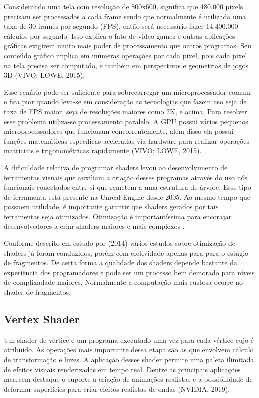 Considerando uma tela com resolução de 800x600, significa que 480.000 pixels precisam ser processados a cada frame sendo que normalmente é utilizada uma taxa de 30 frames por segundo (\acrshort{FPS}), então será necessário fazer 14.400.000 cálculos por segundo. Isso explica o fato de video games e outras aplicações gráficas exigirem muito mais poder de processamento que outros programas. Seu conteúdo gráfico implica em inúmeras operações por cada pixel, pois cada pixel na tela precisa ser computado, e também em perspectivas e geometrias de jogos 3D (VIVO; LOWE, 2015)\nocite{bookOfShaders}.  

Esse cenário pode ser suficiente para sobrecarregar um microprocessador comum e fica pior quando leva-se em consideração as tecnologias que fazem uso seja de taxa de FPS maior, seja de resoluções maiores como 2K, e acima. Para resolver esse problema utiliza-se processamento paralelo. A GPU possui vários pequenos microprocessadores que funcionam concorrentemente, além disso ela possui funções matemáticas específicas aceleradas via hardware para realizar operações matriciais e trigonométricas rapidamente (VIVO; LOWE, 2015)\nocite{bookOfShaders}.

A dificuldade relativa de programar shaders levou ao desenvolvimento de ferramentas visuais que auxiliam a criação desses programas através do uso nós funcionais conectados entre si que remetem a uma estrutura de árvore. Esse tipo de ferramenta está presente na Unreal Engine desde 2005. Ao mesmo tempo que possuem utilidade, é importante garantir que shaders gerados por tais ferramentas seja otimizados. Otimização é importantíssima para encorajar desenvolvedores a criar shaders maiores e mais complexos \cite{jensen2007shader}.

Conforme descrito em estudo por  (2014) vários estudos sobre otimização de shaders já foram conduzidos, porém com efetividade apenas para para o estágio de fragmentos. De certa forma a qualidade dos shaders depende bastante da experiência dos programadores e pode ser um processo bem demorado para níveis de complixadade maiores. Normalmente a computação mais custosa ocorre no shader de fragmentos. 

\subsection{Vertex Shader}
\label{vertex-shader}

Um shader de vértice é um programa executado uma vez para cada vértice cujo é atribuído. As operações mais importante dessa etapa são as que envolvem cálculo de transformação e luzes. A aplicação desses shader permite uma paleta ilimitada de efeitos visuais renderizadas em tempo real. Dentre as principais aplicações merecem destaque o suporte a criação de animações realistas e a possibilidade de deformar superfícies para criar efeitos realistas de ondas (NVIDIA, 2019)\nocite{vertexShader}.

